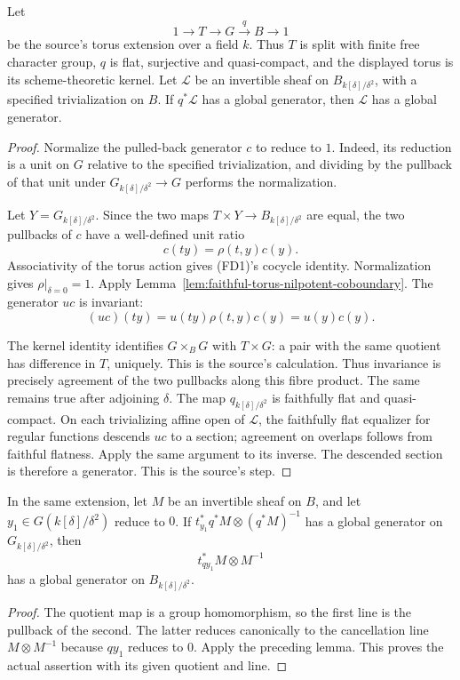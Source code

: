 \begin{srlemma}\label{lem:faithful-torus-line-descent}
Let
\[
                      1\longrightarrow T\longrightarrow G
                           \stackrel q\longrightarrow B\longrightarrow1
\]
be the source's torus extension over a field \(k\).
Thus \(T\) is split with finite free character group,
\(q\) is flat, surjective and quasi-compact, and the
displayed torus is its scheme-theoretic kernel.
Let \(\mathcal L\) be an invertible sheaf on
\(B_{k[\delta]/\delta^2}\), with a specified trivialization
on \(B\).
If \(q^*\mathcal L\) has a global generator, then
\(\mathcal L\) has a global generator.
\end{srlemma}
\begin{proof}
Normalize the pulled-back generator \(c\) to reduce to \(1\).
Indeed, its reduction is a unit on \(G\) relative to the
specified trivialization, and dividing by the pullback
of that unit under
\(G_{k[\delta]/\delta^2}\to G\) performs the normalization.

Let \(Y=G_{k[\delta]/\delta^2}\).
Since the two maps \(T\times Y\to B_{k[\delta]/\delta^2}\)
are equal, the two pullbacks of \(c\) have a well-defined
unit ratio
\[
                               c(ty)=\rho(t,y)c(y).
\]
Associativity of the torus action gives (FD1)'s cocycle
identity.  Normalization gives \(\rho|_{\delta=0}=1\).
Apply Lemma~\ref{lem:faithful-torus-nilpotent-coboundary}.
The generator \(u c\) is invariant:
\[
                   (u c)(ty)=u(ty)\rho(t,y)c(y)=u(y)c(y).
\]

The kernel identity identifies
\(G\times_B G\) with \(T\times G\):
a pair with the same quotient has difference in \(T\),
uniquely.
This is the source's  calculation.
Thus invariance is precisely agreement of the two
pullbacks along this fibre product.
The same remains true after adjoining \(\delta\).
The map \(q_{k[\delta]/\delta^2}\) is faithfully flat
and quasi-compact.
On each trivializing affine open of \(\mathcal L\),
the faithfully flat equalizer for regular functions
descends \(u c\) to a section; agreement on overlaps
follows from faithful flatness.
Apply the same argument to its inverse.
The descended section is therefore a generator.
This is the source's  step.
\end{proof}

\begin{srcorollary}\label{cor:faithful-translation-line-descent}
In the same extension, let \(M\) be an invertible sheaf on
\(B\), and let \(y_1\in G(k[\delta]/\delta^2)\) reduce to \(0\).
If
\(t_{y_1}^*q^*M\otimes(q^*M)^{-1}\)
has a global generator on \(G_{k[\delta]/\delta^2}\), then
\[
                              t_{q y_1}^*M\otimes M^{-1}
\]
has a global generator on \(B_{k[\delta]/\delta^2}\).
\end{srcorollary}
\begin{proof}
The quotient map is a group homomorphism, so the first
line is the pullback of the second.
The latter reduces canonically to the cancellation line
\(M\otimes M^{-1}\) because \(q y_1\) reduces to \(0\).
Apply the preceding lemma.
This proves the actual  assertion
with its given quotient and line.
\end{proof}

